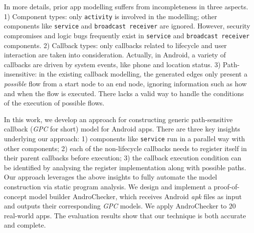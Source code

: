 
In more details, prior app modelling suffers from incompleteness in three aspects. 1) Component types: only \texttt{activity} is involved in the modelling; other components like \texttt{service} and \texttt{broadcast receiver} are ignored. However, security compromises and logic bugs frequently exist in \texttt{service} and \texttt{broadcast receiver} components. 2) Callback types: only callbacks related to lifecycle and user interaction are taken into consideration. Actually, in Android, a variety of callbacks are driven by system events, like phone and location status. 
3) Path-insensitive: in the existing callback modelling, the generated edges only present a \textit{possible} flow from a start node to an end node, ignoring information such as how and when the flow is executed. There lacks a valid way to handle the conditions of the execution of possible flows.
 
   

In this work, we develop an approach for constructing generic path-sensitive callback (\textit{GPC} for short) model for Android apps.
There are three key insights underlying our approach: 1) components like \texttt{service} run in a parallel way with other components; 2) each of the non-lifecycle callbacks needs to register itself in their parent callbacks before execution; 3) the callback execution condition can be identified by analysing the register implementation along with possible paths. Our approach leverages the above insights to fully automate the model construction via static program analysis. 
%
We design and implement a proof-of-concept model builder AndroChecker, which receives Android \textit{apk} files as input and outputs their corresponding \textit{GPC} models. We apply AndroChecker to $20$ real-world apps. The evaluation results show that our technique is both accurate and complete. 

